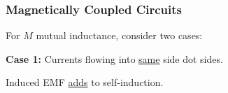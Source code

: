 \subsubsection{Magnetically Coupled Circuits}

\begin{multicols}{2}

    \begin{CheatsheetEntryFrame}


        For $M$ mutual inductance, consider two cases:

        \bigskip

        \textbf{Case 1:} Currents flowing into \ul{same} side dot sides.

         Induced EMF \ul{adds} to self-induction.

        \medskip


\end{CheatsheetEntryFrame}
\end{multicols}
